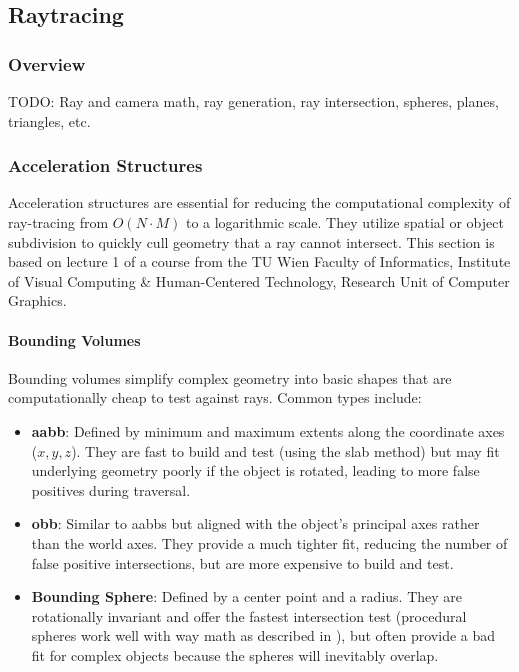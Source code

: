 \subsection{Raytracing}\label{subsec:raytracing}

\subsubsection{Overview}\label{subsubsec:rt-overview}

TODO: Ray and camera math, ray generation, ray intersection, spheres, planes, triangles, etc.

\subsubsection{Acceleration Structures}\label{subsubsec:acceleration-structures}

Acceleration structures are essential for reducing the computational complexity of ray-tracing
from $O(N \cdot M)$ to a logarithmic scale.
They utilize spatial or object subdivision to quickly cull geometry that a ray cannot intersect.
This section is based on lecture 1 of a course from the TU Wien Faculty of Informatics,
Institute of Visual Computing \& Human-Centered Technology,
Research Unit of Computer Graphics\cite{tuwien_rendering_2020}.


\paragraph{Bounding Volumes}\label{par:bounding-volumes}

Bounding volumes simplify complex geometry into basic shapes
that are computationally cheap to test against rays.
Common types include:

\begin{itemize}
    \item \textbf{\gls{aabb}}: {
        Defined by minimum and maximum extents along the coordinate axes ($x, y, z$).
        They are fast to build and test (using the slab method) but may fit underlying geometry poorly
        if the object is rotated, leading to more false positives during traversal.
    }
    \item \textbf{\gls{obb}}: {
        Similar to \glspl{aabb} but aligned with the object's principal axes rather than the world axes.
        They provide a much tighter fit, reducing the number of false positive intersections,
        but are more expensive to build and test.
    }
    \item \textbf{Bounding Sphere}: {
        Defined by a center point and a radius.
        They are rotationally invariant and offer the fastest intersection test
        (procedural spheres work well with way math as described in ),
        but often provide a bad fit for complex objects because the spheres will inevitably overlap.
    }
\end{itemize}

